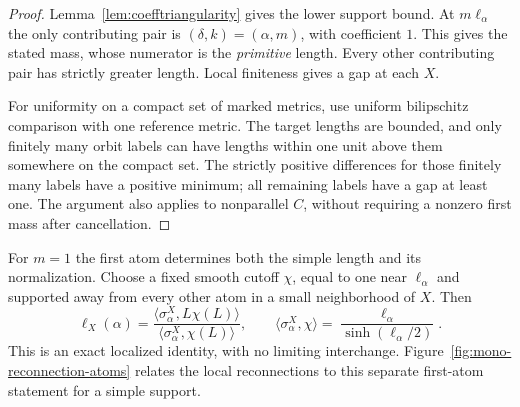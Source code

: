 \begin{proof}
Lemma~\ref{lem:coefftriangularity} gives the lower support bound.
At $m\ell_\alpha$ the only contributing pair is
$(\delta,k)=(\alpha,m)$, with coefficient $1$. This gives the
stated mass, whose numerator is the \emph{primitive} length.
Every other contributing pair has strictly greater length.
Local finiteness gives a gap at each $X$.

For uniformity on a compact set of marked metrics, use uniform
bilipschitz comparison with one reference metric. The target lengths
are bounded, and only finitely many orbit labels can have lengths
within one unit above them somewhere on the compact set. The
strictly positive differences for those finitely many labels have
a positive minimum; all remaining labels have a gap at least one.
The argument also applies to nonparallel $C$, without requiring a
nonzero first mass after cancellation.
\end{proof}

For $m=1$ the first atom determines both the simple length and its
normalization. Choose a fixed smooth cutoff $\chi$, equal to one
near $\ell_\alpha$ and supported away from every other atom in a
small neighborhood of $X$. Then
\begin{equation}
 \boxed{
 \ell_X(\alpha)
 =\frac{\langle\sigma_\alpha^X,L\chi(L)\rangle}
        {\langle\sigma_\alpha^X,\chi(L)\rangle},\qquad
 \langle\sigma_\alpha^X,\chi\rangle
 =\frac{\ell_\alpha}{\sinh(\ell_\alpha/2)}.
 }
 \label{eq:coeffmomentratio}
\end{equation}
This is an exact localized identity, with no limiting interchange.
Figure~\ref{fig:mono-reconnection-atoms} relates the local reconnections
to this separate first-atom statement for a simple support.

